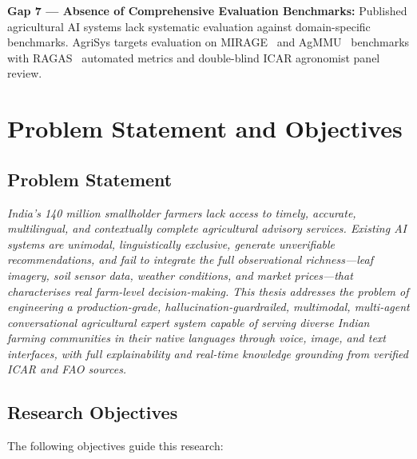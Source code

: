 \documentclass[12pt,a4paper]{article}
\newlength{\defbaselineskip}
\newcommand{\setlinespacing}[1]{\setlength{\baselineskip}{#1 \defbaselineskip}}
\begin{document}
\textbf{Gap 7 --- Absence of Comprehensive Evaluation Benchmarks:}
Published agricultural AI systems lack systematic evaluation against domain-specific benchmarks. AgriSys targets evaluation on MIRAGE~\cite{mirage2025} and AgMMU~\cite{agmmu2025} benchmarks with RAGAS~\cite{ragas2023} automated metrics and double-blind ICAR agronomist panel review.

\clearpage
\section{Problem Statement and Objectives}
\enlargethispage{3\baselineskip}
\setlinespacing{0.94}

\subsection{Problem Statement}

\begin{mdframed}[linecolor=primaryBlue, linewidth=1.5pt, innerleftmargin=8pt, innerrightmargin=8pt, innertopmargin=2pt, innerbottommargin=2pt, skipabove=2pt, skipbelow=2pt]
\textit{India's 140 million smallholder farmers lack access to timely, accurate, multilingual, and contextually complete agricultural advisory services. Existing AI systems are unimodal, linguistically exclusive, generate unverifiable recommendations, and fail to integrate the full observational richness---leaf imagery, soil sensor data, weather conditions, and market prices---that characterises real farm-level decision-making. This thesis addresses the problem of engineering a production-grade, hallucination-guardrailed, multimodal, multi-agent conversational agricultural expert system capable of serving diverse Indian farming communities in their native languages through voice, image, and text interfaces, with full explainability and real-time knowledge grounding from verified ICAR and FAO sources.}
\end{mdframed}

\subsection{Research Objectives}

The following objectives guide this research:
\end{document}
